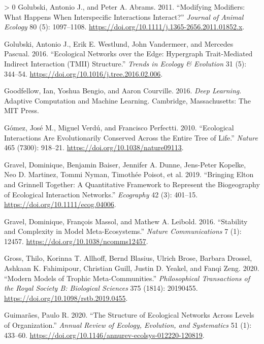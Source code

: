 \documentclass[11pt]{article}
\newlength{\cslhangindent}
\newenvironment{CSLReferences}[3] %
 {%
  \setlength{\parindent}{0pt}
  \ifodd #1 \everypar{\setlength{\hangindent}{\cslhangindent}}\ignorespaces\fi
  \ifnum #2 > 0
  \setlength{\parskip}{#2\baselineskip}
  \fi
 }%
 {}
\begin{document}
\begin{CSLReferences}{1}{0}
\leavevmode\hypertarget{ref-Golubski2011ModMod}{}%
Golubski, Antonio J., and Peter A. Abrams. 2011. {``Modifying Modifiers:
What Happens When Interspecific Interactions Interact?''} \emph{Journal
of Animal Ecology} 80 (5): 1097--1108.
\url{https://doi.org/10.1111/j.1365-2656.2011.01852.x}.

\leavevmode\hypertarget{ref-Golubski2016EcoNet}{}%
Golubski, Antonio J., Erik E. Westlund, John Vandermeer, and Mercedes
Pascual. 2016. {``Ecological Networks over the Edge: Hypergraph
Trait-Mediated Indirect Interaction (TMII) Structure.''} \emph{Trends in
Ecology \& Evolution} 31 (5): 344--54.
\url{https://doi.org/10.1016/j.tree.2016.02.006}.

\leavevmode\hypertarget{ref-Goodfellow2016DeeLea}{}%
Goodfellow, Ian, Yoshua Bengio, and Aaron Courville. 2016. \emph{Deep
Learning}. Adaptive Computation and Machine Learning. Cambridge,
Massachusetts: The MIT Press.

\leavevmode\hypertarget{ref-Gomez2010EcoInt}{}%
Gómez, José M., Miguel Verdú, and Francisco Perfectti. 2010.
{``Ecological Interactions Are Evolutionarily Conserved Across the
Entire Tree of Life.''} \emph{Nature} 465 (7300): 918--21.
\url{https://doi.org/10.1038/nature09113}.

\leavevmode\hypertarget{ref-Gravel2019BriElt}{}%
Gravel, Dominique, Benjamin Baiser, Jennifer A. Dunne, Jens-Peter
Kopelke, Neo D. Martinez, Tommi Nyman, Timothée Poisot, et al. 2019.
{``Bringing Elton and Grinnell Together: A Quantitative Framework to
Represent the Biogeography of Ecological Interaction Networks.''}
\emph{Ecography} 42 (3): 401--15.
\url{https://doi.org/10.1111/ecog.04006}.

\leavevmode\hypertarget{ref-Gravel2016StaCom}{}%
Gravel, Dominique, François Massol, and Mathew A. Leibold. 2016.
{``Stability and Complexity in Model Meta-Ecosystems.''} \emph{Nature
Communications} 7 (1): 12457. \url{https://doi.org/10.1038/ncomms12457}.

\leavevmode\hypertarget{ref-Gross2020ModMod}{}%
Gross, Thilo, Korinna T. Allhoff, Bernd Blasius, Ulrich Brose, Barbara
Drossel, Ashkaan K. Fahimipour, Christian Guill, Justin D. Yeakel, and
Fanqi Zeng. 2020. {``Modern Models of Trophic Meta-Communities.''}
\emph{Philosophical Transactions of the Royal Society B: Biological
Sciences} 375 (1814): 20190455.
\url{https://doi.org/10.1098/rstb.2019.0455}.

\leavevmode\hypertarget{ref-Guimaraes2020StrEco}{}%
Guimarães, Paulo R. 2020. {``The Structure of Ecological Networks Across
Levels of Organization.''} \emph{Annual Review of Ecology, Evolution,
and Systematics} 51 (1): 433--60.
\url{https://doi.org/10.1146/annurev-ecolsys-012220-120819}.


\end{CSLReferences}
\end{document}

